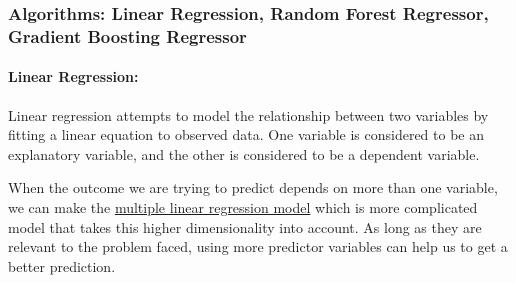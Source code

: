 \documentclass[11pt]{article}
\begin{document}
\subsubsection{Algorithms: Linear Regression, Random Forest Regressor, Gradient Boosting Regressor}
\label{Regression_algorithms}

\paragraph*{Linear Regression:}
Linear regression attempts to model the relationship between two variables by fitting a linear equation to observed data. One variable is considered to be an explanatory variable, and the other is considered to be a dependent variable. 

When the outcome we are trying to predict depends on more than one variable, we can make the \href{https://towardsdatascience.com/supervised-learning-basics-of-linear-regression-1cbab48d0eba}{multiple linear regression model} which is more complicated model that takes this higher dimensionality into account. As long as they are relevant to the problem faced, using more predictor variables can help us to get a better prediction.
\end{document}
